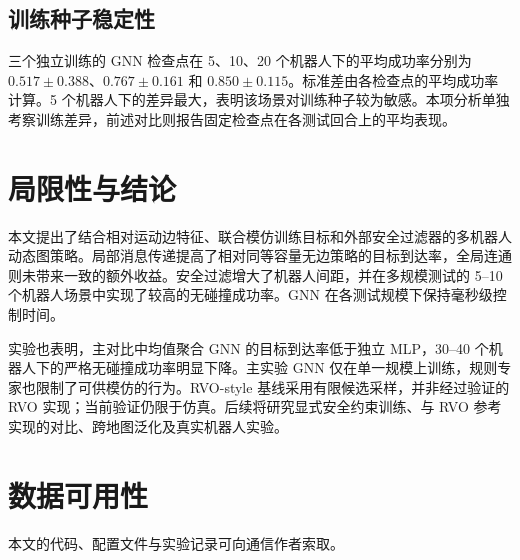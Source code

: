\documentclass[conference]{IEEEtran}
\begin{document}
\subsection{训练种子稳定性}
三个独立训练的 GNN 检查点在 5、10、20 个机器人下的平均成功率分别为 $0.517\pm0.388$、$0.767\pm0.161$ 和 $0.850\pm0.115$。标准差由各检查点的平均成功率计算。5 个机器人下的差异最大，表明该场景对训练种子较为敏感。本项分析单独考察训练差异，前述对比则报告固定检查点在各测试回合上的平均表现。

\section{局限性与结论}

本文提出了结合相对运动边特征、联合模仿训练目标和外部安全过滤器的多机器人动态图策略。局部消息传递提高了相对同等容量无边策略的目标到达率，全局连通则未带来一致的额外收益。安全过滤增大了机器人间距，并在多规模测试的 5--10 个机器人场景中实现了较高的无碰撞成功率。GNN 在各测试规模下保持毫秒级控制时间。

实验也表明，主对比中均值聚合 GNN 的目标到达率低于独立 MLP，30--40 个机器人下的严格无碰撞成功率明显下降。主实验 GNN 仅在单一规模上训练，规则专家也限制了可供模仿的行为。RVO-style 基线采用有限候选采样，并非经过验证的 RVO 实现；当前验证仍限于仿真。后续将研究显式安全约束训练、与 RVO 参考实现的对比、跨地图泛化及真实机器人实验。

\section*{数据可用性}

本文的代码、配置文件与实验记录可向通信作者索取。



\end{document}
